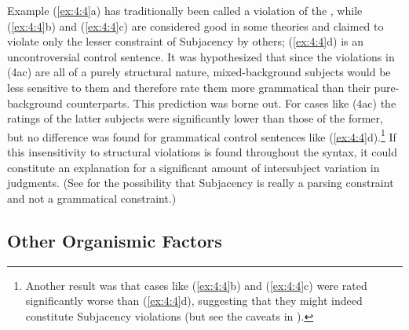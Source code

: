\noindent
Example (\ref{ex:4:4}a) has traditionally been called a violation of the , while (\ref{ex:4:4}b) and (\ref{ex:4:4}c) are considered good in some theories and claimed to violate only the lesser constraint of Subjacency by others; (\ref{ex:4:4}d) is an uncontroversial control sentence. It was hypothesized that since the violations  in (4a\textendash{}c) are all of a purely structural nature, mixed-background subjects would be less sensitive to them and therefore rate them more grammatical than their pure-background counterparts. This prediction was borne out. For cases like (4a\textendash{}c) the ratings of the latter subjects were significantly lower than those of the former, but
no difference was found for grammatical control sentences 
like (\ref{ex:4:4}d).\footnote{Another result was that cases like (\ref{ex:4:4}b) and (\ref{ex:4:4}c) were rated significantly worse than (\ref{ex:4:4}d), suggesting that they might indeed constitute Subjacency violations (but see the caveats in ).}
 If this insensitivity to structural violations is found throughout the syntax, it could constitute an explanation for a significant amount of intersubject variation in judgments. (See  for the possibility that Subjacency is really a parsing constraint and not a grammatical constraint.)

\subsection{Other Organismic Factors}\label{sec:4.3.3}

